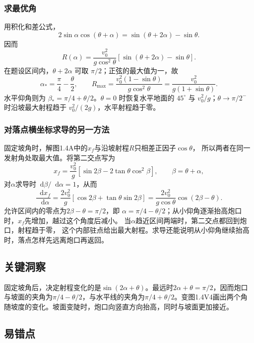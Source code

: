\documentclass[UTF8,fontset=fandol,a4paper,11pt]{ctexart}
\newcommand{\dd}{\mathop{}\!\mathrm{d}}
\begin{document}
\subsubsection*{求最优角}
用积化和差公式，
\[
2\sin\alpha\cos(\theta+\alpha)
=\sin(\theta+2\alpha)-\sin\theta.
\]
因而
\[
R(\alpha)=\frac{v_0^2}{g\cos^2\theta}
[\sin(\theta+2\alpha)-\sin\theta].
\]
在题设区间内，$\theta+2\alpha$ 可取 $\pi/2$；正弦的最大值为一，故
\[
\boxed{\alpha_*=\frac\pi4-\frac\theta2},\qquad
\boxed{R_{\max}=\frac{v_0^2(1-\sin\theta)}{g\cos^2\theta}
=\frac{v_0^2}{g(1+\sin\theta)}}.
\]
水平仰角则为 $\beta_* =\pi/4+\theta/2$。$\theta=0$ 时恢复水平地面的 $45^\circ$ 与 $v_0^2/g$；$\theta\to\pi/2^-$ 时沿坡最大射程趋于 $v_0^2/(2g)$，水平射程趋于零。
\subsubsection*{对落点横坐标求导的另一方法}
固定坡角时，解图1.4A中的$x_f$与沿坡射程$R$只相差正因子$\cos\theta$，
所以两者在同一发射角处取最大值。将第二交点写为
\[
x_f=\frac{v_0^2}{g}
\left[\sin2\beta-2\tan\theta\cos^2\beta\right],
\qquad \beta=\theta+\alpha,
\]
对$\alpha$求导时$\dd\beta/\dd\alpha=1$，从而
\[
\frac{\dd x_f}{\dd\alpha}
=\frac{2v_0^2}{g}
[\cos2\beta+\tan\theta\sin2\beta]
=\frac{2v_0^2}{g\cos\theta}\cos(2\beta-\theta).
\]
允许区间内的零点为$2\beta-\theta=\pi/2$，即
$\alpha=\pi/4-\theta/2$；从小仰角逐渐抬高炮口时，$x_f$先增加，越过这个角度后减小。
当$\alpha$趋近区间两端时，第二交点都回到炮口，射程趋于零，
这个内部驻点给出最大射程。求导还能说明从小仰角继续抬高时，落点怎样先远离炮口再返回。




\subsection*{关键洞察}

固定坡角后，决定射程变化的是$\sin(2\alpha+\theta)$。最远时$2\alpha+\theta=\pi/2$，因而炮口与坡面的夹角为$\pi/4-\theta/2$，与水平线的夹角为$\pi/4+\theta/2$。变图1.4V4画出两个角随坡度的变化。坡面变陡时，炮口向竖直方向抬高，同时与坡面更加接近。



\subsection*{易错点}
\end{document}
